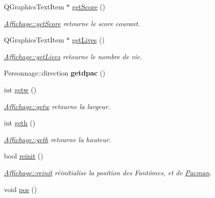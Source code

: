 \begin{DoxyCompactItemize}
\item 
Q\+Graphics\+Text\+Item $\ast$ \hyperlink{class_affichage_a41ffc7a4bb4e64ef9493dd41f9f057ca}{get\+Score} ()
\begin{DoxyCompactList}\small\item\em \hyperlink{class_affichage_a41ffc7a4bb4e64ef9493dd41f9f057ca}{Affichage\+::get\+Score} retourne le score courant. \end{DoxyCompactList}\item 
Q\+Graphics\+Text\+Item $\ast$ \hyperlink{class_affichage_a572f5cb4fee01d58d666fc34ae22b418}{get\+Lives} ()
\begin{DoxyCompactList}\small\item\em \hyperlink{class_affichage_a572f5cb4fee01d58d666fc34ae22b418}{Affichage\+::get\+Lives} retourne le nombre de vie. \end{DoxyCompactList}\item 
\hypertarget{class_affichage_a2113c196d59dd2f0a1a745ede1129435}{}Personnage\+::direction {\bfseries getdpac} ()\label{class_affichage_a2113c196d59dd2f0a1a745ede1129435}

\item 
int \hyperlink{class_affichage_acde5838337208b097a71e750f6fde45f}{getw} ()
\begin{DoxyCompactList}\small\item\em \hyperlink{class_affichage_acde5838337208b097a71e750f6fde45f}{Affichage\+::getw} retourne la largeur. \end{DoxyCompactList}\item 
int \hyperlink{class_affichage_a549580ae1e685576c009d944b61bc1d0}{geth} ()
\begin{DoxyCompactList}\small\item\em \hyperlink{class_affichage_a549580ae1e685576c009d944b61bc1d0}{Affichage\+::geth} retourne la hauteur. \end{DoxyCompactList}\item 
bool \hyperlink{class_affichage_ac9c697bea5a46b784a1be6d281210852}{reinit} ()
\begin{DoxyCompactList}\small\item\em \hyperlink{class_affichage_ac9c697bea5a46b784a1be6d281210852}{Affichage\+::reinit} réinitialise la position des Fantômes, et de \hyperlink{class_pacman}{Pacman}. \end{DoxyCompactList}\item 
\hypertarget{class_affichage_addd80e1c405b812b62aac143be89c47f}{}void \hyperlink{class_affichage_addd80e1c405b812b62aac143be89c47f}{pos} ()\label{class_affichage_addd80e1c405b812b62aac143be89c47f}


\end{DoxyCompactItemize}
